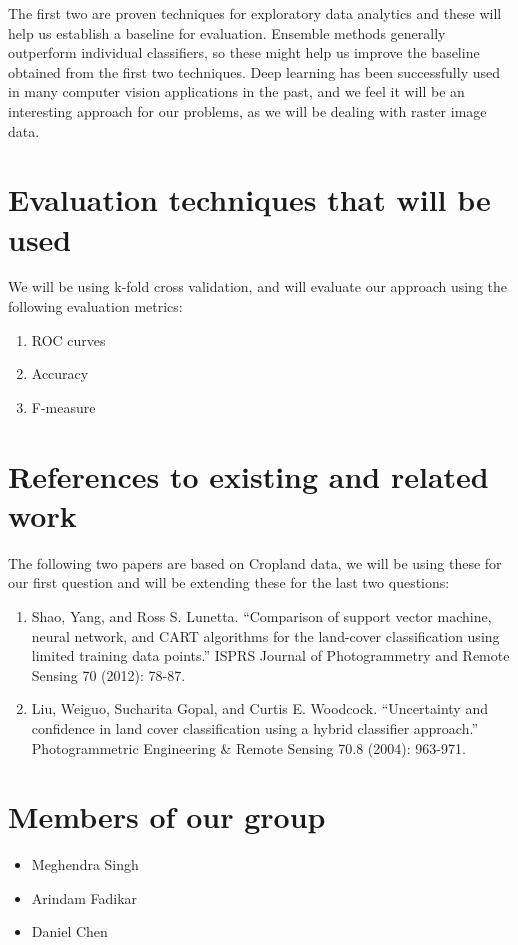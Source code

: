 \documentclass[10pt,letterpaper]{article}
\begin{document}
\noindent
The first two are proven techniques for exploratory data analytics and these will help us establish a baseline for evaluation. Ensemble methods generally outperform individual classifiers, so these might help us improve the baseline obtained from the first two techniques. Deep learning has been successfully used in many computer vision applications in the past, and we feel it will be an interesting approach for our problems, as we will be dealing with raster image data.

\section{Evaluation techniques that will be used}

We will be using k-fold cross validation, and will evaluate our approach using the following evaluation metrics:
\begin{enumerate}
	\item ROC curves
	\item Accuracy
	\item F-measure
\end{enumerate}

\section{References to existing and related work}

The following two papers are based on Cropland data, we will be using these for our first question and will be extending these for the last two questions:

\begin{enumerate}
	\item Shao, Yang, and Ross S. Lunetta. ``Comparison of support vector machine, neural network, and CART algorithms for the land-cover classification using limited training data points.'' ISPRS Journal of Photogrammetry and Remote Sensing 70 (2012): 78-87.
	\item Liu, Weiguo, Sucharita Gopal, and Curtis E. Woodcock. ``Uncertainty and confidence in land cover classification using a hybrid classifier approach.'' Photogrammetric Engineering \& Remote Sensing 70.8 (2004): 963-971.
\end{enumerate}


\section{Members of our group}

\begin{itemize}
	\item Meghendra Singh
	\item Arindam Fadikar
	\item Daniel Chen
\end{itemize}
\end{document}
